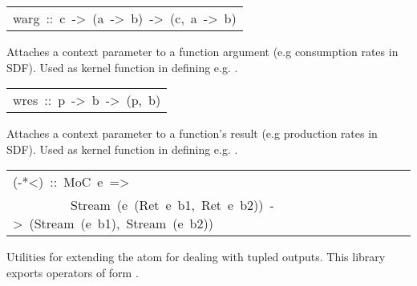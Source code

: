 \begin{haddockdesc}
\item[\begin{tabular}{@{}l}
warg\ ::\ c\ ->\ (a\ ->\ b)\ ->\ (c,\ a\ ->\ b)
\end{tabular}]\haddockbegindoc
Attaches a context parameter to a function argument (e.g
 consumption rates in SDF). Used as kernel function in defining
 e.g. .\par

\end{haddockdesc}
\begin{haddockdesc}
\item[\begin{tabular}{@{}l}
wres\ ::\ p\ ->\ b\ ->\ (p,\ b)
\end{tabular}]\haddockbegindoc
Attaches a context parameter to a function's result (e.g
 production rates in SDF). Used as kernel function in defining
 e.g. .\par

\end{haddockdesc}
\begin{haddockdesc}
\item[\begin{tabular}{@{}l}
(-*<)\ ::\ MoC\ e\ =>\\\ \ \ \ \ \ \ \ \ Stream\ (e\ (Ret\ e\ b1,\ Ret\ e\ b2))\ ->\ (Stream\ (e\ b1),\ Stream\ (e\ b2))
\end{tabular}]\haddockbegindoc
Utilities for extending the \haddockid{-*} atom for dealing with tupled
 outputs. This library exports operators of form .\par

\end{haddockdesc}